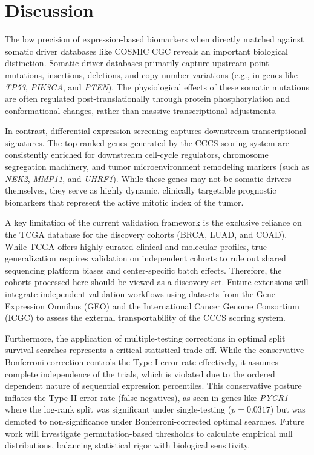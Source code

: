 \documentclass[11pt,a4paper]{article}
\begin{document}
\section{Discussion}
The low precision of expression-based biomarkers when directly matched against somatic driver databases like COSMIC CGC reveals an important biological distinction. Somatic driver databases primarily capture upstream point mutations, insertions, deletions, and copy number variations (e.g., in genes like \textit{TP53}, \textit{PIK3CA}, and \textit{PTEN}). The physiological effects of these somatic mutations are often regulated post-translationally through protein phosphorylation and conformational changes, rather than massive transcriptional adjustments. 

In contrast, differential expression screening captures downstream transcriptional signatures. The top-ranked genes generated by the CCCS scoring system are consistently enriched for downstream cell-cycle regulators, chromosome segregation machinery, and tumor microenvironment remodeling markers (such as \textit{NEK2}, \textit{MMP11}, and \textit{UHRF1}). While these genes may not be somatic drivers themselves, they serve as highly dynamic, clinically targetable prognostic biomarkers that represent the active mitotic index of the tumor.

A key limitation of the current validation framework is the exclusive reliance on the TCGA database for the discovery cohorts (BRCA, LUAD, and COAD). While TCGA offers highly curated clinical and molecular profiles, true generalization requires validation on independent cohorts to rule out shared sequencing platform biases and center-specific batch effects. Therefore, the cohorts processed here should be viewed as a discovery set. Future extensions will integrate independent validation workflows using datasets from the Gene Expression Omnibus (GEO) and the International Cancer Genome Consortium (ICGC) to assess the external transportability of the CCCS scoring system.

Furthermore, the application of multiple-testing corrections in optimal split survival searches represents a critical statistical trade-off. While the conservative Bonferroni correction controls the Type I error rate effectively, it assumes complete independence of the trials, which is violated due to the ordered dependent nature of sequential expression percentiles. This conservative posture inflates the Type II error rate (false negatives), as seen in genes like \textit{PYCR1} where the log-rank split was significant under single-testing ($p=0.0317$) but was demoted to non-significance under Bonferroni-corrected optimal searches. Future work will investigate permutation-based thresholds to calculate empirical null distributions, balancing statistical rigor with biological sensitivity.
\end{document}
